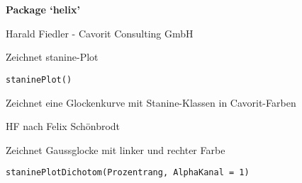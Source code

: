 \documentclass[a4paper]{book}
\begin{document}
\chapter*{}
\begin{center}
{\textbf{\huge Package `helix'}}
\par\bigskip{\large \today}
\end{center}
\begin{description}
\raggedright{}
\item[Type]
\item[Title]
\item[Version]
\item[Date]
\item[Author]
\item[Maintainer]\AsIs{}
\item[Description]
\item[License]
\end{description}
%
\begin{Author}\relax
Harald Fiedler - Cavorit Consulting GmbH
\end{Author}
%
\begin{Description}\relax
Zeichnet stanine-Plot
\end{Description}
%
\begin{Usage}
\begin{verbatim}
staninePlot()
\end{verbatim}
\end{Usage}
%
\begin{Details}\relax
Zeichnet eine Glockenkurve mit Stanine-Klassen in Cavorit-Farben
\end{Details}
%
\begin{Author}\relax
HF nach Felix Schönbrodt
\end{Author}
%
\begin{Description}\relax
Zeichnet Gaussglocke mit linker und rechter Farbe
\end{Description}
%
\begin{Usage}
\begin{verbatim}
staninePlotDichotom(Prozentrang, AlphaKanal = 1)
\end{verbatim}
\end{Usage}
\end{document}
